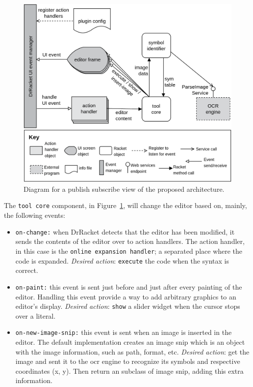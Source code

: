 \begin{figure}[htb]
 \vspace{-15pt}
	\centering
	\includegraphics[scale=0.19]{img/solution}
	\vspace{-10pt}
	\caption{Diagram for a publish subscribe view of the proposed architecture.}
	\label{fig:solution}
 \vspace{-10pt}
\end{figure}

The \texttt{tool core} component, in Figure~\ref{fig:solution}, will change the editor based on, mainly, the following events:

\begin{itemize}
	\item \texttt{on-change:} when DrRacket detects that the editor has been modified, it sends the contents of the editor over to action handlers.
	The action handler, in this case is the \texttt{online expansion handler}; a separated place where the code is expanded. \textit{Desired action}: \texttt{execute} the code when the syntax is correct. 

	\item \texttt{on-paint:} this event is sent just before and just after every painting of the editor. Handling this event provide a way to add arbitrary graphics to an editor's display. \textit{Desired action}: \texttt{show} a slider widget when the cursor stops over a literal.

	\item \texttt{on-new-image-snip:} this event is sent when an image is inserted in the editor. The default implementation creates an image snip which is an object with the image information, such as path, format, etc. \textit{Desired action}: get the image and sent it to the \ac{ocr} engine to recognize its symbols and respective coordinates (x, y). Then return an subclass of image snip, adding this extra information.
\end{itemize}

